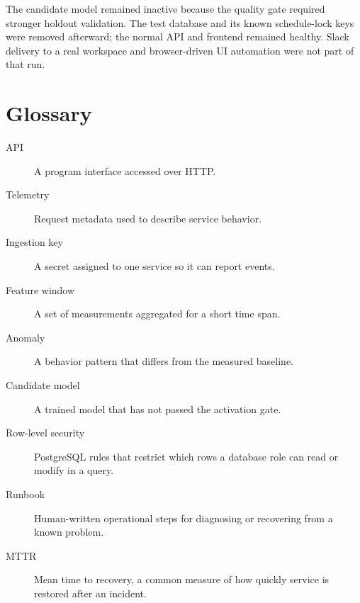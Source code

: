 \documentclass[11pt,a4paper]{article}
\begin{document}
The candidate model remained inactive because the quality gate required stronger
holdout validation. The test database and its known schedule-lock keys were
removed afterward; the normal API and frontend remained healthy. Slack delivery
to a real workspace and browser-driven UI automation were not part of that run.

\section{Glossary}
\begin{description}
  \item[API] A program interface accessed over HTTP.
  \item[Telemetry] Request metadata used to describe service behavior.
  \item[Ingestion key] A secret assigned to one service so it can report events.
  \item[Feature window] A set of measurements aggregated for a short time span.
  \item[Anomaly] A behavior pattern that differs from the measured baseline.
  \item[Candidate model] A trained model that has not passed the activation gate.
  \item[Row-level security] PostgreSQL rules that restrict which rows a database
  role can read or modify in a query.
  \item[Runbook] Human-written operational steps for diagnosing or recovering
  from a known problem.
  \item[MTTR] Mean time to recovery, a common measure of how quickly service is
  restored after an incident.
\end{description}
\end{document}
